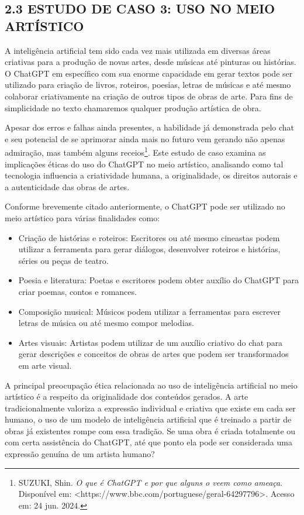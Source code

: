 \subsection*{{2.3 ESTUDO DE CASO 3: USO NO MEIO ARTÍSTICO}}
A inteligência artificial tem sido cada vez mais utilizada em diversas áreas criativas para a produção de novas artes, desde músicas até pinturas ou histórias. O ChatGPT em específico com sua enorme capacidade em gerar textos pode ser utilizado para criação de livros, roteiros, poesias, letras de músicas e até mesmo colaborar criativamente na criação de outros tipos de obras de arte. Para fins de simplicidade no texto chamaremos qualquer produção artística de obra. 

Apesar dos erros e falhas ainda presentes, a habilidade já demonstrada pelo chat e seu potencial de se aprimorar ainda mais no futuro vem gerando não apenas admiração, mas também alguns receios\footnote{SUZUKI, Shin. \textit{O que é ChatGPT e por que alguns o veem como ameaça}. Disponível em: <https://www.bbc.com/portuguese/geral-64297796>. Acesso em: 24 jun. 2024.}. Este estudo de caso examina as implicações éticas do uso do ChatGPT no meio artístico, analisando como tal tecnologia influencia a criatividade humana, a originalidade, os direitos autorais e a autenticidade das obras de artes.

Conforme brevemente citado anteriormente, o ChatGPT pode ser utilizado no meio artístico para várias finalidades como:

\begin{itemize}
    \item Criação de histórias e roteiros: Escritores ou até mesmo cineastas podem utilizar a ferramenta para gerar diálogos, desenvolver roteiros e histórias, séries ou peças de teatro.
    \item Poesia e literatura: Poetas e escritores podem obter auxílio do ChatGPT para criar poemas, contos e romances.
    \item Composição musical: Músicos podem utilizar a ferramentas para escrever letras de música ou até mesmo compor melodias.
    \item Artes visuais: Artistas podem utilizar de um auxílio criativo do chat para gerar descrições e conceitos de obras de artes que podem ser transformados em arte visual.
\end{itemize}

A principal preocupação ética relacionada ao uso de inteligência artificial no meio artístico é a respeito da originalidade dos conteúdos gerados. A arte tradicionalmente valoriza a expressão individual e criativa que existe em cada ser humano, o uso de um modelo de inteligência artificial que é treinado a partir de obras já existentes rompe com essa tradição. Se uma obra é criada totalmente ou com certa assistência do ChatGPT, até que ponto ela pode ser considerada uma expressão genuína de um artista humano?

